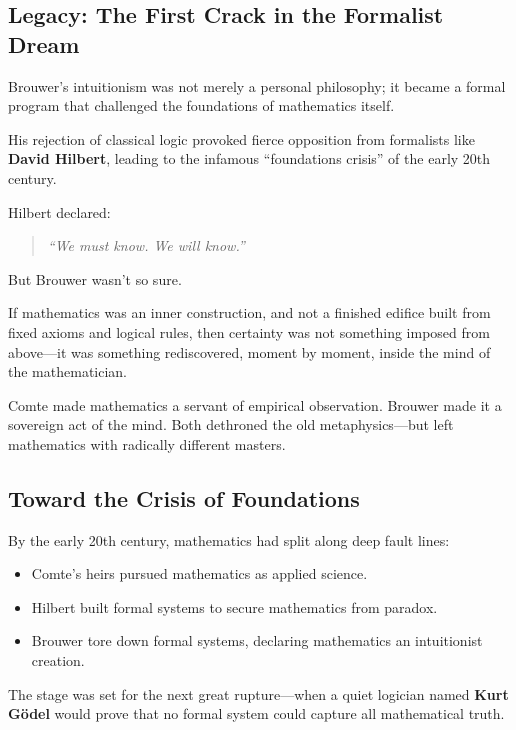 \subsection*{Legacy: The First Crack in the Formalist Dream}

Brouwer’s intuitionism was not merely a personal philosophy; it became a formal program that challenged the foundations of mathematics itself.

His rejection of classical logic provoked fierce opposition from formalists like \textbf{David Hilbert}, leading to the infamous “foundations crisis” of the early 20th century.

Hilbert declared:

\begin{quote}
\textit{“We must know. We will know.”}
\end{quote}

But Brouwer wasn’t so sure.

If mathematics was an inner construction, and not a finished edifice built from fixed axioms and logical rules, then certainty was not something imposed from above—it was something rediscovered, moment by moment, inside the mind of the mathematician.

\begin{tcolorbox}[colback=white, colframe=black!50!white, title={From Positivism to Intuitionism}]
Comte made mathematics a servant of empirical observation.  
Brouwer made it a sovereign act of the mind.  
Both dethroned the old metaphysics—but left mathematics with radically different masters.
\end{tcolorbox}

\subsection*{Toward the Crisis of Foundations}

By the early 20th century, mathematics had split along deep fault lines:

\begin{itemize}
    \item Comte’s heirs pursued mathematics as applied science.
    \item Hilbert built formal systems to secure mathematics from paradox.
    \item Brouwer tore down formal systems, declaring mathematics an intuitionist creation.
\end{itemize}

The stage was set for the next great rupture—when a quiet logician named \textbf{Kurt Gödel} would prove that no formal system could capture all mathematical truth.

